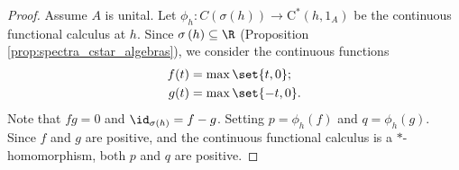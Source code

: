 \begin{proof}
  Assume $A$ is unital. Let $\phi_h\colon C\left( \sigma\left( h \right) \right)\rightarrow \mathrm{C}^{\ast}\left( h,1_A \right)$ be the continuous functional calculus at $h$. Since $\sigma\left( h \right)\subseteq \R$ (Proposition \ref{prop:spectra_cstar_algebras}), we consider the continuous functions
  \begin{align*}
    f(t) &= \max\set{t,0};\\
    g(t) &= \max\set{-t,0}.
  \end{align*}
  Note that $fg = 0$ and $\id_{\sigma\left( h \right)} = f-g$. Setting $p = \phi_h(f)$ and $q = \phi_h(g)$. Since $f$ and $g$ are positive, and the continuous functional calculus is a $\ast$-homomorphism, both $p$ and $q$ are positive.\newline


\end{proof}
